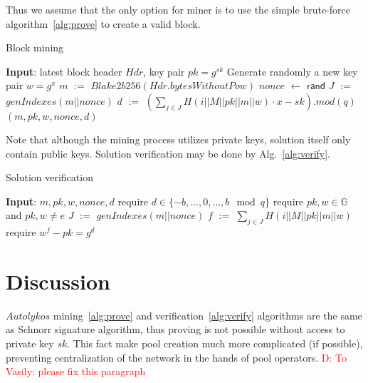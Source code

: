\documentclass[]{article}
\newcommand{\dnote}[1]{\textcolor{red}{D: {#1}}}
\newcommand{\Name}{$Autolykos$}
\def\Let#1#2{\State #1 $:=$ #2}
\def\LetRnd#1#2{\State #1 $\gets$ #2}
\begin{document}
    Thus we assume that the only option for miner is to use the simple brute-force algorithm~\ref{alg:prove} to
    create a valid block.

    \begin{algorithm}[H]
        \caption{Block mining}
        \label{alg:prove}
        \begin{algorithmic}[1]
            \State \textbf{Input}: latest block header $Hdr$, key pair $pk=g^{sk}$
            \State Generate randomly a new key pair $w=g^x$
            \Let{$m$}{$Blake2b256(Hdr.bytesWithoutPow)$}
            \LetRnd{$nonce$}{$\mathsf{rand}$}
            \Let{$J$}{$genIndexes(m||nonce)$}
            \Let{$d$}{$(\sum_{j \in J}{H(i||M||pk||m||w)} \cdot x - sk).mod(q)$}
            \State \Return $(m,pk,w,nonce,d)$
            \EndIf
            \EndWhile
        \end{algorithmic}
    \end{algorithm}

    Note that although the mining process utilizes private keys, solution itself
    only contain public keys. Solution verification may be done by Alg.~\ref{alg:verify}.

    \begin{algorithm}[H]
        \caption{Solution verification}
        \label{alg:verify}
        \begin{algorithmic}[1]
            \State \textbf{Input}: $m,pk,w,nonce,d$
            \State require $d\in\{-b,\dots,0,\dots, b\mod q\}$
            \State require $pk,w\in \mathbb{G}$ and $pk,w \ne e$
            \Let{$J$}{$genIndexes(m||nonce)$}
            \Let{$f$}{$\sum_{j \in J} H(i||M||pk||m||w)$}
            \State require $w^f - pk = g^d$
        \end{algorithmic}
    \end{algorithm}

    \section{Discussion}
    \label{discussion}

    \Name{} mining~\ref{alg:prove} and verification~\ref{alg:verify} algorithms are
    the same as Schnorr signature algorithm, thus proving is not possible without access
    to private key $sk$. This fact make pool creation much more complicated (if possible),
    preventing centralization of the network in the hands of pool operators. \dnote{To Vasily: please fix this paragraph}
\end{document}
